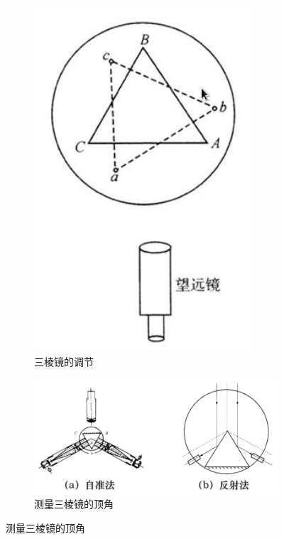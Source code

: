 \documentclass{ctexart}
\begin{document}
\begin{figure}[H]
  \centering
  \begin{subfigure}{.25\textwidth}
    \centering
    \includegraphics[width=\linewidth]{figures/三棱镜的调节}
    \caption{三棱镜的调节}
  \end{subfigure}
  \begin{subfigure}{.7\textwidth}
    \centering
    \includegraphics[width=\linewidth]{figures/三棱镜顶角的测量}
    \caption{测量三棱镜的顶角}
  \end{subfigure}
\end{figure}
\end{document}
